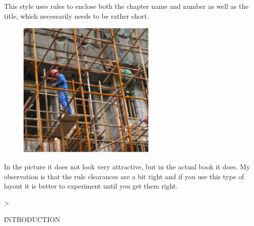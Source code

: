 \documentclass{book}
\makeatletter
\newif\if@lefttitle
\newif\if@righttitle
\newif\if@leftname
\newif\if@rightname
\newif\if@chapterspaceout\@chapterspaceoutfalse
\newif\if@titlespaceout\@chapterspaceoutfalse
\renewcommand\@makechapterhead[2][]{%
  \def\printnumber{%
    \numberbefore@cx
      {%
      \numbercolor@cx
      \numberfontsize@cx
      \numberfontfamily@cx
      \numberfontweight@cx
      \thechapter
      \numberpunctuation@cx
      }
      \numberafter@cx
  }%
  \def\printchaptername{%
    {
    \chapterfontfamily@cx
    \chapterfontsize@cx
    \chapterfontweight@cx
    \color{\chaptercolor@cx}
    \if@chapterspaceout 
     \expandafter\so\expandafter{\chaptername}
    \else
      \@chapapp\space
    \fi
    }%
  }%
    {%
    \parindent0pt 
    \normalfont%
    \ifnum \c@secnumdepth>\m@ne%
      \if@mainmatter%
         \chapterbefore@cx%
         \if@leftname
            \printnumber
         \fi%
         \printchaptername
         \if@rightname
            \printnumber
         \fi%
         \chapterafter@cx  
      \fi%
    \fi%
    \interlinepenalty\@M%
     \titlebeforeskip@cx%
     \if@lefttitle%
       \beforenumber@cx%
       \counterdisplay\c@chapter\afternumber@cx%
     \fi
      \titlefontfamily@cx
      \titlefontweight@cx
      \titlefontsize@cx
      \titlefontcolor@cx
      \selectfont
      \titlebefore@cx%
      \if@titlespaceout
         \so{#2}%
      \else
         #2
      \fi%
      \titleafter@cx
    \if@righttitle%
      \afternumber@cx
      \counterdisplay\c@chapter\afternumber@cx%
    \fi
    \par\nobreak%
    \titleafterskip@cx
    \thispagestyle{\headerstyle@cx}
}}
\makeatother
\begin{document}
This style uses rules to enclose both the chapter name and number as well as the title, which necessarily needs to be rather short.
\medskip

\begin{figure}[ht]
\centering
\includegraphics[width=0.6\textwidth]{./chapters/cap3}
\end{figure}
In the picture it does not look very attractive, but in the actual book it does. My observation is that the rule clearances are a bit tight and if you use this type of layout it is better to experiment until you get them right.

\begin{tcblisting}{}
\@makechapterhead[
 name=CHAPTER,
 numbering=arabic,
 number font-size=\LARGE,
 number font-family=\sffamily,
 number font-weight=\bfseries,
 number before={},
 number position=rightname,
 chapter font-family=\sffamily,
 chapter font-weight=\bfseries,
 number after={},
 chapter before={\rule{\textwidth}{2pt}\par},
 chapter after={\vskip0pt\vspace*{-8pt}\rule{\textwidth}{.4pt}\vskip-7pt},
 chapter color={black!90},
 number color=\color{black!90},
 title beforeskip={},
 title afterskip={\vspace{50pt}},
 title before=,
 title after={\par\vskip-19pt\rule{\textwidth}{0.4pt}\par} ,
 title font-family=\sffamily,
 title font-color=\color{black!80},
 title font-weight=\bfseries,
 title font-size=\LARGE,
 chapter font-size=\LARGE]{INTRODUCTION}
\end{tcblisting}


\end{document}
